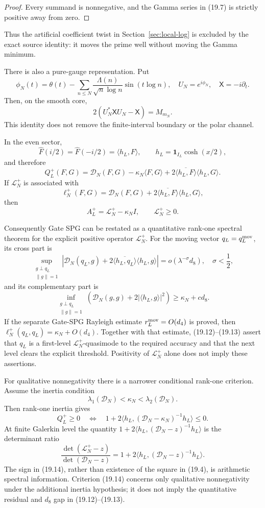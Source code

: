 \documentclass[11pt]{amsart}
\theoremstyle{definition}
\theoremstyle{remark}
\begin{document}
\begin{proof}
Every summand is nonnegative, and the Gamma series in (19.7) is strictly
positive away from zero.
\end{proof}

Thus the artificial coefficient twist in Section~\ref{sec:local-log} is
excluded by the exact source identity: it moves the prime well without
moving the Gamma minimum.

There is also a pure-gauge representation.  Put
\[
 \phi_N(t)=
 \theta(t)-\sum_{n\le N}
 \frac{\Lambda(n)}{\sqrt n\log n}\sin(t\log n),
 \quad U_N=e^{i\phi_N},
 \quad\mathsf X=-i\partial_t.
\]
Then, on the smooth core,
\[
 2(U_N^*\mathsf XU_N-\mathsf X)=M_{m_N}.
\tag{19.9}
\]
This identity does not remove the finite-interval boundary or the polar
channel.

In the even sector,
\[
 \widehat F(i/2)=\widehat F(-i/2)
 =\langle h_L,F\rangle,
 \qquad h_L=\mathbf1_{I_L}\cosh(x/2),
\]
and therefore
\[
\boxed{
 Q_L^+(F,G)
 =
 \mathcal D_N(F,G)-\kappa_N\langle F,G\rangle
 +2\overline{\langle h_L,F\rangle}\langle h_L,G\rangle.}
\tag{19.10}
\]
If \(\mathcal L_N^+\) is associated with
\[
 \ell_N^+(F,G)
 =
 \mathcal D_N(F,G)
 +2\overline{\langle h_L,F\rangle}\langle h_L,G\rangle,
\]
then
\[
\boxed{A_L^+=\mathcal L_N^+-\kappa_NI,\qquad\mathcal L_N^+\ge0.}
\tag{19.11}
\]

Consequently Gate SPG can be restated as a quantitative rank-one spectral
theorem for the explicit positive operator \(\mathcal L_N^+\).  For the moving vector
\(q_L=q_L^{\rm mov}\), its cross part is
\[
\sup_{\substack{g\perp q_L\\\|g\|=1}}
\left|
\mathcal D_N(q_L,g)
+2\overline{\langle h_L,q_L\rangle}\langle h_L,g\rangle
\right|
=o(\lambda^{-\sigma}d_8),
\quad \sigma<\frac12,
\tag{19.12}
\]
and its complementary part is
\[
\inf_{\substack{g\perp q_L\\\|g\|=1}}
\left(\mathcal D_N(g,g)+2|\langle h_L,g\rangle|^2\right)
\ge\kappa_N+cd_8.
\tag{19.13}
\]
If the separate Gate-SPG Rayleigh estimate
\(r_L^{\rm mov}=O(d_4)\) is proved, then
\(\ell_N^+(q_L,q_L)=\kappa_N+O(d_4)\).  Together with that estimate,
(19.12)--(19.13) assert that \(q_L\) is a first-level
\(\mathcal L_N^+\)-quasimode to the required accuracy and that
the next level clears the explicit threshold.  Positivity of
\(\mathcal L_N^+\) alone does not imply these assertions.

For qualitative nonnegativity there is a narrower conditional rank-one
criterion.  Assume the inertia condition
\[
 \lambda_1(\mathcal D_N)<\kappa_N<\lambda_2(\mathcal D_N).
\]
Then rank-one inertia gives
\[
 Q_L^+\ge0
 \quad\Longleftrightarrow\quad
 1+2\langle h_L,(\mathcal D_N-\kappa_N)^{-1}h_L\rangle\le0.
\tag{19.14}
\]
At finite Galerkin level the quantity
\(1+2\langle h_L,(\mathcal D_N-z)^{-1}h_L\rangle\) is the determinant ratio
\[
 \frac{\det(\mathcal L_N^+-z)}
 {\det(\mathcal D_N-z)}
 =
 1+2\langle h_L,(\mathcal D_N-z)^{-1}h_L\rangle.
\tag{19.15}
\]
The sign in (19.14), rather than existence of the square in (19.4), is
arithmetic spectral information.  Criterion (19.14) concerns only
qualitative nonnegativity under the additional inertia hypothesis; it does
not imply the quantitative residual and \(d_8\) gap in
(19.12)--(19.13).
\end{document}
